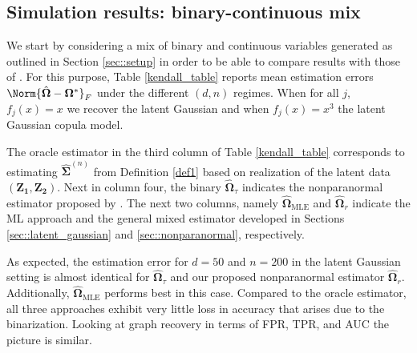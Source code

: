 \subsection{Simulation results: binary-continuous mix} 

We start by considering a mix of binary and continuous variables generated as outlined in Section \ref{sec::setup} in order to be able to compare results with those of \citet{Fan17}. For this purpose, Table \ref{kendall_table} reports mean estimation errors $\Norm{\hat{\boldsymbol\Omega} - \boldsymbol\Omega^*}_F$ under the different $(d,n)$ regimes. When for all $j$, $f_j(x) = x$ we recover the latent Gaussian and when $f_j(x) = x^3$ the latent Gaussian copula model. 

The oracle estimator in the third column of Table \ref{kendall_table} corresponds to estimating $\hat{\boldsymbol\Sigma}^{(n)}$ from Definition \ref{def1} based on realization of the latent data $(\boldsymbol{Z_1},\boldsymbol{Z_2})$. Next in column four, the binary $\hat{\boldsymbol\Omega}_\tau$ indicates the nonparanormal estimator proposed by \citet{Fan17}. The next two columns, namely $\hat{\boldsymbol\Omega}_{\text{MLE}}$ and $\hat{\boldsymbol\Omega}_r$ indicate the ML approach and the general mixed estimator developed in Sections \ref{sec::latent_gaussian} and \ref{sec::nonparanormal}, respectively.   

As expected, the estimation error for $d = 50$ and $n=200$ in the latent Gaussian setting is almost identical for $\hat{\boldsymbol\Omega}_\tau$ and our proposed nonparanormal estimator $\hat{\boldsymbol\Omega}_r$. Additionally, $\hat{\boldsymbol\Omega}_{\text{MLE}}$ performs best in this case. Compared to the oracle estimator, all three approaches exhibit very little loss in accuracy that arises due to the binarization. Looking at graph recovery in terms of FPR, TPR, and AUC the picture is similar. 


